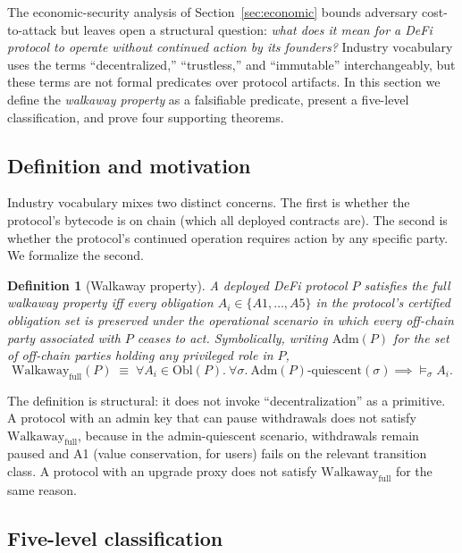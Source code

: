 \documentclass[11pt,a4paper]{article}
\newtheorem{definition}[theorem]{Definition}
\begin{document}
The economic-security analysis of Section~\ref{sec:economic} bounds adversary cost-to-attack but leaves open a structural question: \emph{what does it mean for a DeFi protocol to operate without continued action by its founders?} Industry vocabulary uses the terms ``decentralized,'' ``trustless,'' and ``immutable'' interchangeably, but these terms are not formal predicates over protocol artifacts. In this section we define the \emph{walkaway property} as a falsifiable predicate, present a five-level classification, and prove four supporting theorems.

\subsection{Definition and motivation}

Industry vocabulary mixes two distinct concerns. The first is whether the protocol's bytecode is on chain (which all deployed contracts are). The second is whether the protocol's continued operation requires action by any specific party. We formalize the second.

\begin{definition}[Walkaway property]\label{def:walkaway}
A deployed DeFi protocol $P$ satisfies the \emph{full walkaway property} iff every obligation $A_i \in \{A1,\dots,A5\}$ in the protocol's certified obligation set is preserved under the operational scenario in which every off-chain party associated with $P$ ceases to act. Symbolically, writing $\mathrm{Adm}(P)$ for the set of off-chain parties holding any privileged role in $P$,
\[
\mathrm{Walkaway}_{\mathrm{full}}(P) \;\equiv\; \forall A_i \in \mathrm{Obl}(P).\ \forall \sigma.\ \mathrm{Adm}(P)\text{-quiescent}(\sigma) \implies \models_\sigma A_i.
\]
\end{definition}

The definition is structural: it does not invoke ``decentralization'' as a primitive. A protocol with an admin key that can pause withdrawals does not satisfy $\mathrm{Walkaway}_{\mathrm{full}}$, because in the admin-quiescent scenario, withdrawals remain paused and A1 (value conservation, for users) fails on the relevant transition class. A protocol with an upgrade proxy does not satisfy $\mathrm{Walkaway}_{\mathrm{full}}$ for the same reason.

\subsection{Five-level classification}
\end{document}
